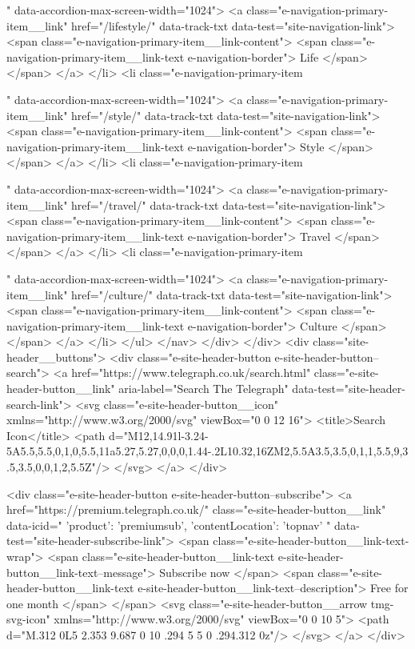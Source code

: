 {{{					
					
					
					" data-accordion-max-screen-width="1024">
<a class="e-navigation-primary-item__link" href="/lifestyle/" data-track-txt data-test="site-navigation-link">
<span class="e-navigation-primary-item__link-content">
<span class="e-navigation-primary-item__link-text e-navigation-border">
Life
</span>
</span>
</a>
</li>
<li class="e-navigation-primary-item
					
					
					
					
					" data-accordion-max-screen-width="1024">
<a class="e-navigation-primary-item__link" href="/style/" data-track-txt data-test="site-navigation-link">
<span class="e-navigation-primary-item__link-content">
<span class="e-navigation-primary-item__link-text e-navigation-border">
Style
</span>
</span>
</a>
</li>
<li class="e-navigation-primary-item
					
					
					
					
					" data-accordion-max-screen-width="1024">
<a class="e-navigation-primary-item__link" href="/travel/" data-track-txt data-test="site-navigation-link">
<span class="e-navigation-primary-item__link-content">
<span class="e-navigation-primary-item__link-text e-navigation-border">
Travel
</span>
</span>
</a>
</li>
<li class="e-navigation-primary-item
					
					
					
					
					" data-accordion-max-screen-width="1024">
<a class="e-navigation-primary-item__link" href="/culture/" data-track-txt data-test="site-navigation-link">
<span class="e-navigation-primary-item__link-content">
<span class="e-navigation-primary-item__link-text e-navigation-border">
Culture
</span>
</span>
</a>
</li>
</ul>
</nav>
</div>
</div>
<div class="site-header__buttons">
<div class="e-site-header-button e-site-header-button--search">
<a href="https://www.telegraph.co.uk/search.html" class="e-site-header-button__link" aria-label="Search The Telegraph" data-test="site-header-search-link">
<svg class="e-site-header-button__icon" xmlns="http://www.w3.org/2000/svg" viewBox="0 0 12 16">
<title>Search Icon</title>
<path d="M12,14.91l-3.24-5A5.5,5.5,0,1,0,5.5,11a5.27,5.27,0,0,0,1.44-.2L10.32,16ZM2,5.5A3.5,3.5,0,1,1,5.5,9,3.5,3.5,0,0,1,2,5.5Z"/>
</svg>
</a>
</div>

<div class="e-site-header-button e-site-header-button--subscribe">
<a href="https://premium.telegraph.co.uk/" class="e-site-header-button__link" data-icid="{ 'product': 'premiumsub', 'contentLocation': 'topnav' }" data-test="site-header-subscribe-link">
<span class="e-site-header-button__link-text-wrap">
<span class="e-site-header-button__link-text e-site-header-button__link-text--message">
Subscribe now
</span>
<span class="e-site-header-button__link-text e-site-header-button__link-text--description">
Free for one month
</span>
</span>
<svg class="e-site-header-button__arrow  tmg-svg-icon" xmlns="http://www.w3.org/2000/svg" viewBox="0 0 10 5">
<path d="M.312 0L5 2.353 9.687 0 10 .294 5 5 0 .294.312 0z"/>
</svg>
</a>
</div>

}}}
